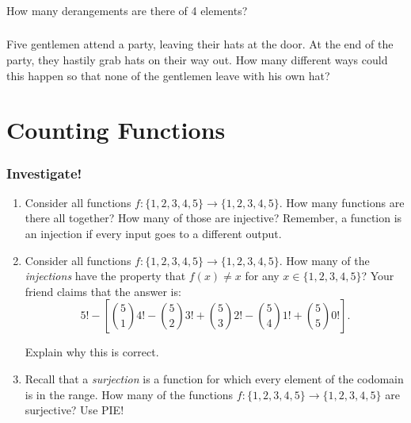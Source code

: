 \documentclass[11pt, compress]{beamer}
\begin{document}
\begin{frame}
\frametitle{}
\begin{example}[1.6.4]How many derangements are there of 4 elements?
\end{example}
\end{frame}
 
\begin{frame}
\frametitle{}
\begin{example}[1.6.5]Five gentlemen attend a party, leaving their hats at the door. At the end of the party, they hastily grab hats on their way out. How many different ways could this happen so that none of the gentlemen leave with his own hat?
\end{example}
\end{frame}
 


\section{Counting Functions}
\begin{frame}
\frametitle{Investigate!}
 \begin{enumerate}
\item{} Consider all functions \(f: \{1,2,3,4,5\} \to \{1,2,3,4,5\}\). How many functions are there all together? How many of those are injective? Remember, a function is an injection if every input goes to a different output.


\item{} Consider all functions \(f: \{1,2,3,4,5\} \to \{1,2,3,4,5\}\). How many of the \emph{injections} have the property that \(f(x) \ne x\) for any \(x \in \{1,2,3,4,5\}\)?
Your friend claims that the answer is:%
\begin{equation*}
5! - \left[ {5\choose 1}4! - {5 \choose 2}3! + {5\choose 3}2! - {5 \choose 4}1! + {5\choose 5}0! \right]\text{.}
\end{equation*}

Explain why this is correct.


\item{} Recall that a \emph{surjection} is a function for which every element of the codomain is in the range. How many of the functions \(f: \{1,2,3,4,5\} \to \{1,2,3,4,5\}\) are surjective? Use PIE!

\end{enumerate}

\end{frame}
 
\end{document}
